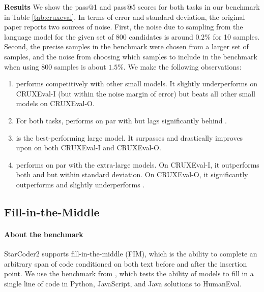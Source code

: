 \documentclass[10pt]{article} %
\newcommand{\remove}[1]{}
\begin{document}
\textbf{Results} We show the pass@1 and pass@5 scores for both tasks in our benchmark in Table \ref{tab:cruxeval}. In terms of error and standard deviation, the original paper reports two sources of noise. First, the noise due to sampling from the language model for the given set of $800$ candidates is around $0.2\%$ for 10 samples. Second, the precise samples in the benchmark were chosen from a larger set of samples, and the noise from choosing which samples to include in the benchmark when using $800$ samples is about $1.5\%$. We make the following observations:

\begin{enumerate}
\item {} performs competitively with other small models. It slightly underperforms  on CRUXEval-I (but within the noise margin of error) but beats all other small models on CRUXEval-O. 

\item For both tasks,  performs on par with  but lags significantly behind .

\item {} is the best-performing large model. It surpasses  and drastically improves upon \remove{ by 17\% and 13\%} on both CRUXEval-I and CRUXEval-O. 

\item {} performs on par with the extra-large models. On CRUXEval-I, it outperforms both  and  but within standard deviation. On CRUXEval-O, it significantly outperforms  and slightly underperforms .
\end{enumerate}

\subsection{Fill-in-the-Middle}


\paragraph{About the benchmark} StarCoder2 supports fill-in-the-middle (FIM), which is the ability to complete an arbitrary span of code conditioned on both text before and after the insertion point. We use the benchmark from \citet{allal2023santacoder}, which tests the ability of models to fill in a single line of code in Python, JavaScript, and Java solutions to HumanEval.
\end{document}
